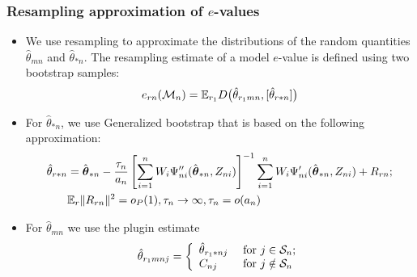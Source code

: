 \documentclass[10pt]{beamer}
\theoremstyle{definition}
\begin{document}
\begin{frame}
\frametitle{Resampling approximation of $e$-values}

\begin{itemize}
\item We use resampling to approximate the distributions of the random quantities $\hat \theta_{m n}$ and $\hat \theta_{* n}$. The resampling estimate of a model $e$-value is defined using two bootstrap samples: 
%
\begin{align*}
e_{r n} ({\cal{M}}_{n}) = {\mathbb{E}}_{r_{1}} D \bigl(  \hat{\theta}_{r_{1} m n}, 
[\hat{\theta}_{r * n}] \bigr)
\end{align*}
%

\item For $\hat \theta_{* n}$, we use {\colbit Generalized bootstrap} \citep{ChatterjeeBose05} that is based on the following approximation:
%
\begin{align*}
\hat\theta_{r * n} & = \hat{{\boldsymbol{\theta}}}_{* n} - \frac{ \tau_n}{a_n} \left[ \sum_{i=1}^n W_i \Psi_{n i}'' (\hat {{\boldsymbol{\theta}}}_{* n}, Z_{n i}) \right]^{-1}
\sum_{i=1}^n W_i \Psi_{n i}' (\hat {{\boldsymbol{\theta}}}_{* n}, Z_{n i}) + R_{rn};\\
& {\mathbb{E}}_r \| R_{r n} \|^2 = o_P(1), \tau_n \rightarrow \infty, \tau_n = o(a_n) \notag 
\end{align*}

\item For $\hat \theta_{m n}$ we use the plugin estimate
\begin{align*}
 \hat{\theta}_{r_{1} m n j} = \left\{ \begin{array}{ll}
 	 \hat{\theta}_{r_1 * n j} & \text{ for } 
 			j \in {\cal{S}}_n; \\
 	 C_{n j} & \text{ for } j \notin {\cal{S}}_n
\end{array}
\right.
\end{align*}
\end{itemize}
\end{frame}
\end{document}
